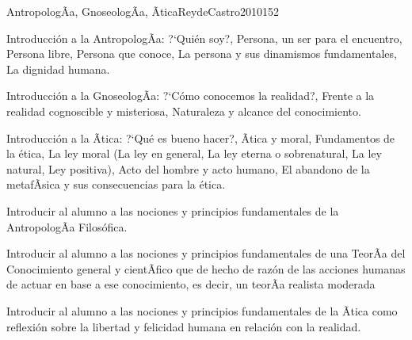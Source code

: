 \begin{syllabus}
\begin{unit}{AntropologÃ­a, GnoseologÃ­a, Ãtica}{ReydeCastro2010}{15}{2}
\begin{topics}
	\item Introducción a la AntropologÃ­a: ?`Quién soy?, Persona, un ser para el encuentro, Persona libre, Persona que conoce, La persona y sus dinamismos fundamentales, La dignidad humana.
	\item Introducción a la GnoseologÃ­a: ?`Cómo conocemos la realidad?, Frente a la realidad cognoscible y misteriosa, Naturaleza y alcance del conocimiento.
	\item Introducción a la Ãtica: ?`Qué es bueno hacer?, Ãtica y moral, Fundamentos de la ética, La ley moral (La ley en general, La ley eterna o sobrenatural, La ley natural, Ley positiva), Acto del hombre y acto humano, El abandono de la metafÃ­sica y sus consecuencias para la ética.
\end{topics}

\begin{unitgoals}
	\item Introducir al alumno a las nociones y principios fundamentales de la AntropologÃ­a Filosófica.
	\item Introducir al alumno a las nociones y principios fundamentales de una TeorÃ­a del Conocimiento general y cientÃ­fico que de hecho de razón de las acciones humanas de actuar en base a ese conocimiento, es decir, un teorÃ­a realista moderada
	\item Introducir al alumno a las nociones y principios fundamentales de la Ãtica como reflexión sobre la libertad y felicidad humana en relación con la realidad.
\end{unitgoals}
\end{unit}


\end{syllabus}
